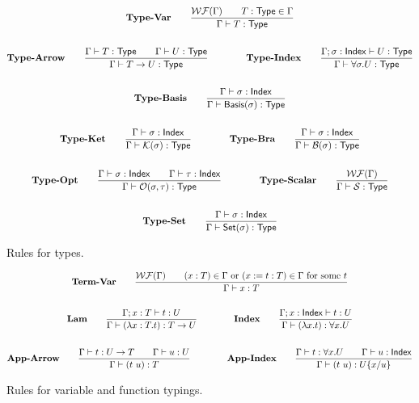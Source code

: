 \documentclass{article}
\begin{document}
\begin{figure}
    \begin{gather*}
        \textbf{Type-Var} \qquad
        \frac{\mathcal{WF}(\Gamma) \qquad T : \mathsf{Type} \in \Gamma}{\Gamma \vdash T : \mathsf{Type}}\\
        \\
        \textbf{Type-Arrow} \qquad
        \frac{\Gamma \vdash T : \mathsf{Type} \qquad \Gamma \vdash U : \mathsf{Type}}{\Gamma \vdash T \to U : \mathsf{Type}}
        \qquad \qquad
        \textbf{Type-Index} \qquad
        \frac{\Gamma ; \sigma : \mathsf{Index} \vdash U : \mathsf{Type}}{\Gamma \vdash \forall \sigma.U : \mathsf{Type}} \\
        \\        
        \textbf{Type-Basis} \qquad
        \frac{\Gamma \vdash \sigma : \mathsf{Index}}{\Gamma \vdash \mathsf{Basis}(\sigma) : \mathsf{Type}}  \\
        \\
        \textbf{Type-Ket} \qquad
        \frac{\Gamma \vdash \sigma : \mathsf{Index}}{\Gamma \vdash \mathcal{K}(\sigma) : \mathsf{Type}}
        \qquad \qquad
        \textbf{Type-Bra} \qquad
        \frac{\Gamma \vdash \sigma : \mathsf{Index}}{\Gamma \vdash \mathcal{B}(\sigma) : \mathsf{Type}} \\
        \\
        \textbf{Type-Opt} \qquad
        \frac{\Gamma \vdash \sigma : \mathsf{Index} \qquad \Gamma \vdash \tau : \mathsf{Index}}{\Gamma \vdash \mathcal{O}(\sigma, \tau) : \mathsf{Type}}
        \qquad \qquad
        \textbf{Type-Scalar} \qquad
        \frac{\mathcal{WF}(\Gamma)}{\Gamma \vdash \mathcal{S} : \mathsf{Type}} \\
        \\
        \textbf{Type-Set} \qquad
        \frac{\Gamma \vdash \sigma : \mathsf{Index}}{\Gamma \vdash \mathsf{Set}(\sigma) : \mathsf{Type}}
    \end{gather*}
    \caption{Rules for types.}
\end{figure}

\begin{figure}[h]
    \begin{gather*}
        \textbf{Term-Var} \qquad
        \frac{\mathcal{WF}(\Gamma) \qquad (x:T) \in \Gamma \text{ or } (x := t : T) \in \Gamma \text{ for some $t$}}{\Gamma \vdash x : T} \\
        \\
        \textbf{Lam} \qquad
        \frac{\Gamma;x:T \vdash t : U}{\Gamma \vdash (\lambda x:T . t) : T \to U}
        \qquad \qquad
        \textbf{Index} \qquad
        \frac{\Gamma; x : \mathsf{Index} \vdash t : U}{\Gamma \vdash (\lambda x.t) : \forall x.U} \\
        \\
        \textbf{App-Arrow} \qquad
        \frac{\Gamma \vdash t:U \to T \qquad \Gamma \vdash u:U}{\Gamma \vdash (t\ u):T}
        \qquad \qquad
        \textbf{App-Index} \qquad
        \frac{\Gamma \vdash t:\forall x.U \qquad \Gamma \vdash u : \mathsf{Index}}{\Gamma \vdash (t\ u):U\{x/u\}}
    \end{gather*}
    \caption{Rules for variable and function typings.}
\end{figure}
\end{document}

